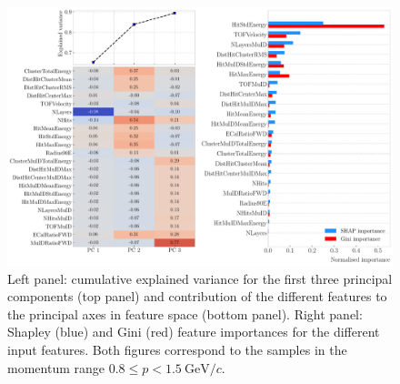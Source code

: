 \begin{figure}[t]
	\centering
	\includegraphics[width=.95\linewidth]{Images/GArSoft_PID/BDT/summary_pca_p0_1.15_sigmap_0.35.pdf}
	\caption[Results of the \gls{pca}, Shapley and Gini feature importance analyses for the momentum range $0.8 \leq p < 1.5 ~ \mathrm{GeV}/c$.]{Left panel: cumulative explained variance for the first three principal components (top panel) and contribution of the different features to the principal axes in feature space (bottom panel). Right panel: Shapley (blue) and Gini (red) feature importances for the different input features. Both figures correspond to the samples in the momentum range $0.8 \leq p < 1.5 ~ \mathrm{GeV}/c$.}
	\label{fig:bdt_pca_importance_iii}
\end{figure}

